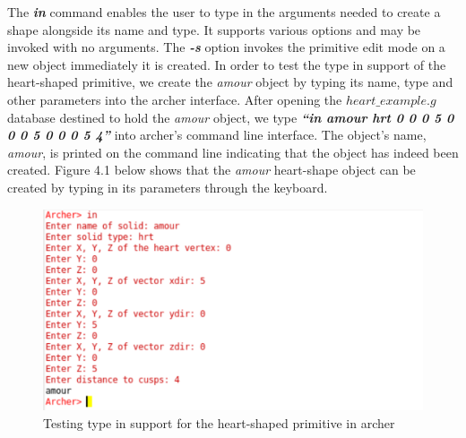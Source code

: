 The   \textit{\textbf{in}}   command   enables   the   user   to   type   in   the   arguments   needed   to   create   a  shape   alongside   its   name   and   type.   It   supports   various   options   and   may   be  
invoked   with   no   arguments.   The   \textit{\textbf{-­s}}   option   invokes   the   primitive   edit   mode   on   a  
new   object   immediately   it   is   created.   In   order   to   test   the   type   in   support   of   the  
heart­-shaped   primitive,   we   create   the   \textit{amour}   object   by   typing   its   name,   type   and  
other   parameters   into   the   archer   interface.   After   opening   the   $heart\_example.g$  
database   destined   to   hold   the   \textit{amour}   object,   we   type   \textit{\textbf{“in   amour   hrt   0  
0   0   5   0   0   0   5   0   0   0   5   4”}}   into   archer's   command   line   interface.   The   object's  
name,   \textit{amour},   is   printed   on   the   command ­line   indicating   that   the   object   has  
indeed   been   created. Figure   4.1 below   shows   that   the   \textit{amour}  
heart-­shape object can be created by typing in its parameters through the keyboard.

\begin{figure}[htbp]
\centering
\includegraphics[trim=0.0cm 0.5cm 0.1cm 0.1cm, clip=true, totalheight=0.4\textheight]{Pictures/Typein.png}
\caption[Testing type in support for the heart-­shaped primitive in archer]{Testing type in support for the heart­-shaped primitive in archer}
\label{Typein}
\end{figure}

\clearpage



